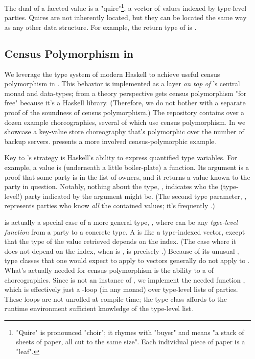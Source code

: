 The dual of a faceted value is a "quire"\footnote{
    "Quire" is pronounced "choir"; it rhymes with "buyer" and means "a stack of sheets of paper, all cut to the same size".
    Each individual piece of paper is a "leaf".
},
a vector of values indexed by type-level parties.
Quires are not inherently located, but they can be located the same way as any other data structure.
For example, the return type of  is
.

\subsection{Census Polymorphism in \MultiChor}
\label{sec:census-poly-haskell}

We leverage the type system of modern Haskell to achieve useful census polymorphism in \MultiChor.
This behavior is implemented as a layer \textit{on top of} \MultiChor's central monad and data-types;
from a theory perspective \MultiChor gets census polymorphism "for free" because it's a Haskell library.
(Therefore, we do not bother with a separate proof of the soundness of census polymorphism.)
The \MultiChor repository contains over a dozen example choreographies, several of which use census polymorphism.
In  we showcase a key-value store choreography that's polymorphic over the number of backup servers.
 presents a more involved census-polymorphic example.

Key to \MultiChor's strategy is Haskell's ability to express quantified type variables.
For example, a  value is (underneath a little boiler-plate) a function.
Its argument is a  proof that some party is in the list of owners,
and it returns a  value known to the party in question.
Notably, nothing about the type, , indicates who the (type-level!) party indicated by the argument might be.
(The second type parameter, , represents parties who know \emph{all} the contained values;
it's frequently .)

 is actually a special case of a more general type,
, where  can be any \emph{type-level function} from a party to a concrete type.
A  is like a type-indexed vector,
except that the type of the value retrieved depends on the index.
(The case where it does not depend on the index, \ie when  is ,
is precisely .)
Because of its unusual , type classes that one would expect to apply to vectors generally do not apply to .
What's actually needed for census polymorphism is the ability to  a  of choreographies.
Since  is not an instance of ,
we implement the needed function , which is effectively just a -loop
(in any monad) over type-level lists of parties.
These loops are not unrolled at compile time;
the type class  affords to the runtime environment sufficient knowledge of the type-level list.


